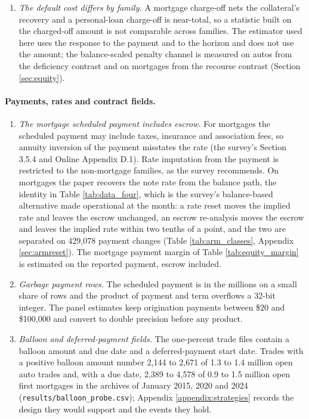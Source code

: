 \begin{enumerate}[resume]
\item \emph{The default cost differs by family.} A mortgage charge-off nets the collateral's recovery and a personal-loan charge-off is near-total, so a statistic built on the charged-off amount is not comparable across families. The estimator used here uses the response to the payment and to the horizon and does not use the amount; the balance-scaled penalty channel is measured on autos from the deficiency contrast and on mortgages from the recourse contrast (Section \ref{sec:equity}).

\end{enumerate}

\paragraph{Payments, rates and contract fields.}

\begin{enumerate}[resume]

\item \emph{The mortgage scheduled payment includes escrow.} For mortgages the scheduled payment may include taxes, insurance and association fees, so annuity inversion of the payment misstates the rate (the survey's Section 3.5.4 and Online Appendix D.1). Rate imputation from the payment is restricted to the non-mortgage families, as the survey recommends. On mortgages the paper recovers the note rate from the balance path, the identity in Table \ref{tab:data_four}, which is the survey's balance-based alternative made operational at the month: a rate reset moves the implied rate and leaves the escrow unchanged, an escrow re-analysis moves the escrow and leaves the implied rate within two tenths of a point, and the two are separated on 429,078 payment changes (Table \ref{tab:arm_classes}, Appendix \ref{sec:armreset}). The mortgage payment margin of Table \ref{tab:equity_margin} is estimated on the reported payment, escrow included.

\item \emph{Garbage payment rows.} The scheduled payment is in the millions on a small share of rows and the product of payment and term overflows a 32-bit integer. The panel estimates keep origination payments between \$20 and \$100,000 and convert to double precision before any product.

\item \emph{Balloon and deferred-payment fields.} The one-percent trade files contain a balloon amount and due date and a deferred-payment start date. Trades with a positive balloon amount number 2,144 to 2,671 of 1.3 to 1.4 million open auto trades and, with a due date, 2,389 to 4,578 of 0.9 to 1.5 million open first mortgages in the archives of January 2015, 2020 and 2024 (\texttt{results/balloon\_probe.csv}); Appendix \ref{appendix:strategies} records the design they would support and the events they hold.

\end{enumerate}


